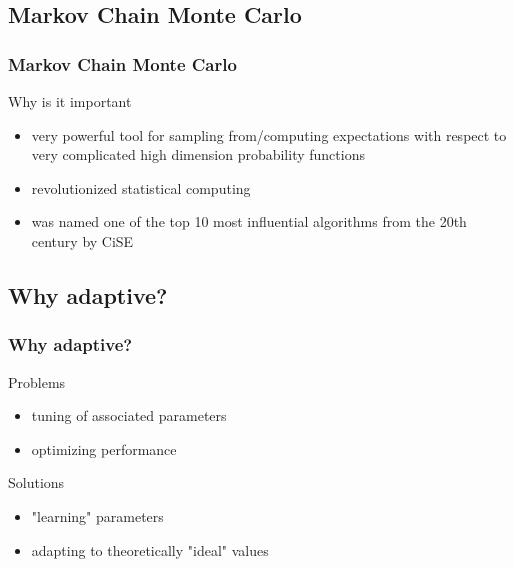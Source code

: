 

\subsection{Markov Chain Monte Carlo}
\begin{frame}
\frametitle{Markov Chain Monte Carlo}
\begin{block}{Why is it important}

\begin{itemize}

\item very powerful tool for sampling from/computing expectations with respect to very complicated high dimension probability functions
\item revolutionized statistical computing 
\item was named one of the top 10 most influential algorithms from the 20th century by CiSE
\end{itemize}
\end{block}
\end{frame}


\subsection{Why adaptive?}
\begin{frame}
\frametitle{Why adaptive?}
\begin{block}{Problems}
\begin{itemize}
\item tuning of associated parameters
\item optimizing performance
\end{itemize} 
\end{block}
\begin{block}{Solutions}
\begin{itemize}


\item "learning" parameters
\item adapting to theoretically "ideal" values 
\end{itemize}
\end{block}
\end{frame}


